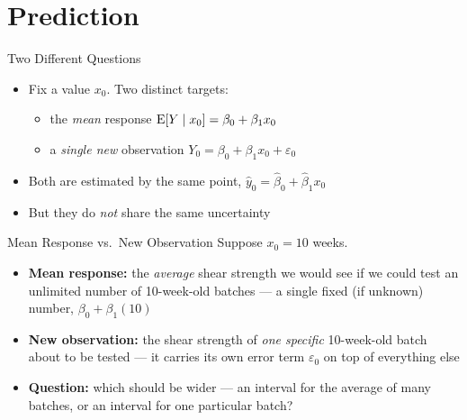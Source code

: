 \section{Prediction}


\begin{frame}{Two Different Questions}
	\begin{itemize}
		\item Fix a value $x_0$. Two distinct targets:
		\begin{itemize}
			\item the \emph{mean} response $\operatorname{E}[Y\mid x_0]=\beta_0+\beta_1 x_0$
			\item a \emph{single new} observation $Y_0=\beta_0+\beta_1 x_0+\varepsilon_0$
		\end{itemize}
		\item Both are estimated by the same point, $\hat y_0=\hat\beta_0+\hat\beta_1 x_0$
		\item But they do \emph{not} share the same uncertainty
	\end{itemize}
\end{frame}


\begin{frame}{Mean Response vs.\ New Observation}
	Suppose $x_0=10$ weeks.
	\begin{itemize}
		\item \textbf{Mean response:} the \emph{average} shear strength we would see if we could test an unlimited number of 10-week-old batches --- a single fixed (if unknown) number, $\beta_0+\beta_1(10)$
		\item \textbf{New observation:} the shear strength of \emph{one specific} 10-week-old batch about to be tested --- it carries its own error term $\varepsilon_0$ on top of everything else
	\end{itemize}
	\svspace{0.5em}
	\begin{itemize}
		\item[] \textbf{Question:} which should be wider --- an interval for the average of many batches, or an interval for one particular batch?
	\end{itemize}
\end{frame}


